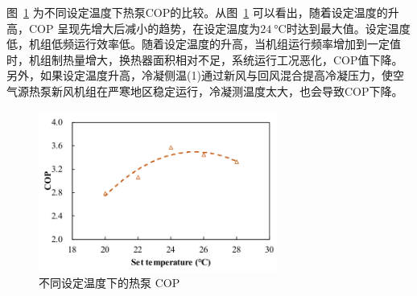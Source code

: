 图~\ref{F:18} 为不同设定温度下热泵COP的比较。从图~\ref{F:18} 可以看出，随着设定温度的升高，COP 呈现先增大后减小的趋势，在设定温度为$\qty{24}{\degreeCelsius} $时达到最大值。设定温度低，机组低频运行效率低。随着设定温度的升高，当机组运行频率增加到一定值时，机组制热量增大，换热器面积相对不足，系统运行工况恶化，COP值下降。另外，如果设定温度升高，冷凝侧温(1)通过新风与回风混合提高冷凝压力，使空气源热泵新风机组在严寒地区稳定运行，冷凝测温度太大，也会导致COP下降。

\begin{figure}[htbp]
	\centering
	\includegraphics[width=0.7\textwidth]{figure/figure_18}
	\caption{不同设定温度下的热泵 COP}
	\label{F:18}
\end{figure}
